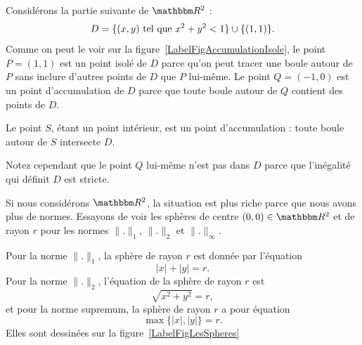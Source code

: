 \newcommand{\CaptionFigAccumulationIsole}{L'ensemble décrit par l'équation \eqref{Eq2807BouleIso}. Le point $P$ est un point isolé de $D$, tandis que  les points $S$ et $Q$ sont des points d'accumulation.}


\begin{example}
	Considérons la partie suivante de $\eR^2$ :
	\begin{equation}	\label{Eq2807BouleIso}
		D=\{ (x,y)\text{ tel que } x^2+y^2<1\}\cup\{ (1,1) \}.
	\end{equation}
	Comme on peut le voir sur la figure~\ref{LabelFigAccumulationIsole}, le point $P=(1,1)$ est un point isolé de $D$ parce qu'on peut tracer une boule autour de $P$ sans inclure d'autres points de $D$ que $P$ lui-même. Le point $Q=(-1,0)$ est un point d'accumulation de $D$ parce que toute boule autour de $Q$ contient des points de $D$.

    Le point $S$, étant un point intérieur, est un point d'accumulation : toute boule autour de $S$ intersecte $D$.

    Notez cependant que le point $Q$ lui-même n'est pas dans $D$ parce que l'inégalité qui définit $D$ est stricte.
\end{example}

\begin{example}
	Si nous considérons $\eR^2$, la situation est plus riche parce que nous avons plus de normes. Essayons de voir les sphères de centre $(0,0)\in\eR^2$ et de rayon $r$ pour les normes $\| . \|_1$, $\| . \|_2$ et $\| . \|_{\infty}$.

	Pour la norme $\| . \|_1$, la sphère de rayon $r$ est donnée par l'équation
	\begin{equation}
		| x |+| y |=r.
	\end{equation}
	Pour la norme $\| . \|_2$, l'équation de la sphère de rayon $r$ est
	\begin{equation}
		\sqrt{x^2+y^2}=r,
	\end{equation}
	et pour la norme supremum, la sphère de rayon $r$ a pour équation
	\begin{equation}
		\max\{ | x |,| y | \}=r.
	\end{equation}
	Elles sont dessinées sur la figure~\ref{LabelFigLesSpheres}
\newcommand{\CaptionFigLesSpheres}{Les sphères de rayon $1$ pour les trois normes classiques.}

\end{example}
